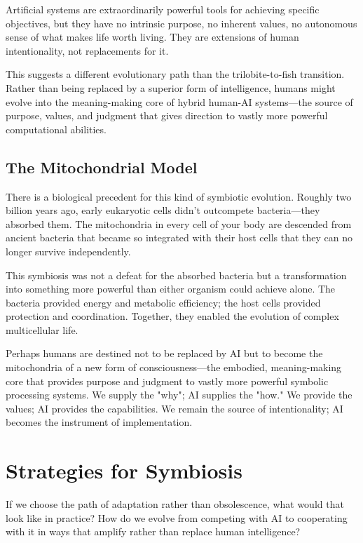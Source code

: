Artificial systems are extraordinarily powerful tools for achieving specific objectives, but they have no intrinsic purpose, no inherent values, no autonomous sense of what makes life worth living. They are extensions of human intentionality, not replacements for it.

This suggests a different evolutionary path than the trilobite-to-fish transition. Rather than being replaced by a superior form of intelligence, humans might evolve into the meaning-making core of hybrid human-AI systems—the source of purpose, values, and judgment that gives direction to vastly more powerful computational abilities.

\subsection{The Mitochondrial Model}

There is a biological precedent for this kind of symbiotic evolution. Roughly two billion years ago, early eukaryotic cells didn't outcompete bacteria—they absorbed them. The mitochondria in every cell of your body are descended from ancient bacteria that became so integrated with their host cells that they can no longer survive independently.

This symbiosis was not a defeat for the absorbed bacteria but a transformation into something more powerful than either organism could achieve alone. The bacteria provided energy and metabolic efficiency; the host cells provided protection and coordination. Together, they enabled the evolution of complex multicellular life.

Perhaps humans are destined not to be replaced by AI but to become the mitochondria of a new form of consciousness—the embodied, meaning-making core that provides purpose and judgment to vastly more powerful symbolic processing systems. We supply the "why"; AI supplies the "how." We provide the values; AI provides the capabilities. We remain the source of intentionality; AI becomes the instrument of implementation.

\section{Strategies for Symbiosis}

If we choose the path of adaptation rather than obsolescence, what would that look like in practice? How do we evolve from competing with AI to cooperating with it in ways that amplify rather than replace human intelligence?

